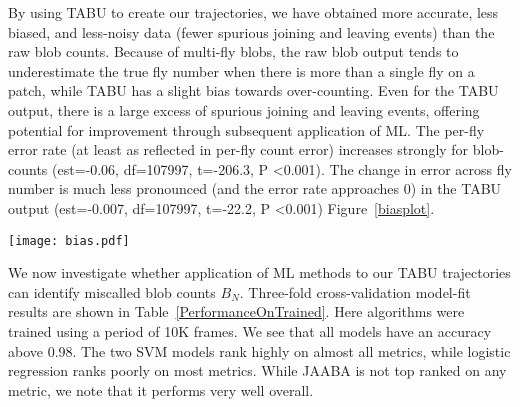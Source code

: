\documentclass[11pt]{article}
\begin{document}
{By using TABU to create our trajectories, we have obtained more accurate, less biased, and less-noisy data (fewer spurious joining and leaving events) than the raw blob counts. Because of multi-fly blobs, the raw blob output tends to underestimate the true fly number when there is more than a single fly on a patch, while TABU has a slight bias towards over-counting. Even for the TABU output, there is a large excess of spurious joining and leaving events, offering potential for improvement through subsequent application of ML. The per-fly error rate (at least as reflected in per-fly count error) increases strongly for blob-counts (est=-0.06, df=107997, t=-206.3, P \textless 0.001). The change in error across fly number is much less pronounced (and the error rate approaches 0) in the TABU output (est=-0.007, df=107997, t=-22.2, P \textless 0.001) Figure~\ref{biasplot}.

\begin{figure*}
\begin{center}
\caption{Heat map of the distribution of per-fly over- and under-counts as function of the number of flies on a patch for each frame across 3 test videos.}
\label{biasplot}
\texttt{[image: bias.pdf]}
\vspace*{-0.15in}
\end{center}
\end{figure*}

We now investigate whether application of ML methods to our TABU trajectories can identify miscalled blob counts $B_N$. Three-fold cross-validation model-fit results are shown in Table~\ref{PerformanceOnTrained}. Here algorithms were trained using a period of 10K frames. We see that all models have an accuracy above 0.98. The two SVM models rank highly on almost all metrics, while logistic regression ranks poorly on most metrics. While JAABA is not top ranked on any metric, we note that it performs very well overall.


}
\end{document}

